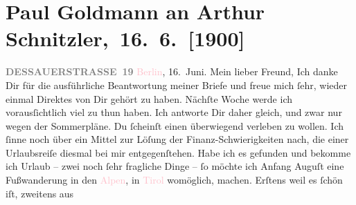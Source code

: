 

         
         \renewcommand{\erwaehntePersonen}{Personen: Richard Beer-Hofmann, Alfred Kerr, Leopoldine Müller, Olga Schnitzler, Leo Van-Jung}
         \renewcommand{\erwaehnteOrte}{Orte: Alpen, Berlin, Dessauer Straße, Dolomiten, Innsbruck, Pontresina, Schruns, Schweiz, Tirol, Trafoi, Vorarlberg, Wien}
         \renewcommand{\erwaehnteWerke}{}
               \section[ Paul Goldmann an Arthur Schnitzler, 16. 6. {[}1900{]}]{Paul Goldmann an Arthur Schnitzler, 16. 6. {[}1900{]}}\nopagebreak{}\rehead{ }\normalsize\beginnumbering{} \toendnotes[C]{\smallbreak\pagebreak[2]} 
\toendnotes[C]{\smallbreak}\pstart
           \noindent{}{\pb}\textcolor{pink}{\textcolor{gray}{\textbf{DESSAUERSTRASSE 19}}}{}\ledrightnote{\textcolor{pink}{Dessauer Straße}}\pend
           \pstart
           \raggedleft{}\textcolor{pink}{Berlin}{}\ledrightnote{\textcolor{pink}{Berlin}}, 16. Juni.\pend
           \pstart\center{}Mein lieber Freund,\pend\pstart
           Ich danke Dir für die ausführliche Beantwortung meiner Briefe und freue mich ſehr,
               wieder einmal Direktes von Dir gehört zu haben. Nächſte Woche werde ich
               vorausſichtlich viel zu thun haben. Ich antworte Dir daher gleich, und zwar nur wegen
               der Sommerpläne.\pend
           \pstart
           Du ſcheinſt einen überwiegend \label{K_L02920-1v}\label{K_L02920-1h} verleben zu wollen.\pend
           \pstart
           Ich ſinne noch über ein Mittel zur Löſung der Finanz-Schwierigkeiten {\pb}nach, die einer Urlaubsreiſe diesmal bei mir \strikeout{\textcolor{gray}{i}} entgegenſtehen. Habe ich es gefunden und bekomme ich Urlaub – zwei noch ſehr
               fragliche Dinge – ſo möchte ich  Anfang Auguſt eine Fußwanderung in den \textcolor{pink}{Alpen}{}\ledrightnote{\textcolor{pink}{Alpen}}, in \textcolor{pink}{Tirol}{}\ledrightnote{\textcolor{pink}{Tirol}} womöglich, machen. Erſtens weil es ſchön iſt, zweitens aus

